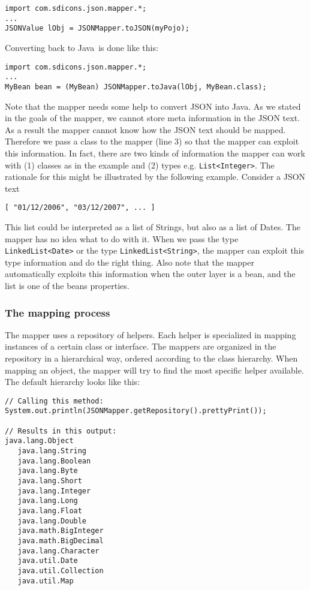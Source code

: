 \documentclass[a4paper]{article}
\newcommand{\java}{Java}
\begin{document}
\medskip
\begin{lstlisting}
import com.sdicons.json.mapper.*;
...
JSONValue lObj = JSONMapper.toJSON(myPojo);
\end{lstlisting}
\medskip

Converting back to \java\ is done like this:

\medskip
\begin{lstlisting}
import com.sdicons.json.mapper.*;
...
MyBean bean = (MyBean) JSONMapper.toJava(lObj, MyBean.class);
\end{lstlisting}
\medskip

Note that the mapper needs some help to convert JSON into \java. As we stated in the goals of the mapper, we cannot store meta information in the JSON text. As a result the mapper cannot know how the JSON text should be mapped. Therefore we pass a class to the mapper (line 3) so that the mapper can exploit this information. In fact, there are two kinds of information the mapper can work with (1) classes as in the example and (2) types e.g. \lstinline{List<Integer>}. The rationale for this might be illustrated by the following example. Consider a JSON text 

\medskip
\begin{lstlisting}
[ "01/12/2006", "03/12/2007", ... ]
\end{lstlisting}
\medskip

This list could be interpreted as a list of Strings, but also as a list of Dates. The mapper has no idea what to do with it. When we pass the type \lstinline{LinkedList<Date>} or the type \lstinline{LinkedList<String>}, the mapper can exploit this type information and do the right thing. Also note that the mapper automatically exploits this information when the outer layer is a bean, and the list is one of the beans properties.

\subsubsection{The mapping process}
\label{mappingprocess}

The mapper uses a repository of helpers. Each helper is specialized in mapping instances of a certain class or interface. The mappers are organized in the repository in a hierarchical way, ordered according to the class hierarchy. When mapping an object, the mapper will try to find the most specific helper available. The default hierarchy looks like this:

\begin{lstlisting}
// Calling this method:
System.out.println(JSONMapper.getRepository().prettyPrint());

// Results in this output:
java.lang.Object
   java.lang.String
   java.lang.Boolean
   java.lang.Byte
   java.lang.Short
   java.lang.Integer
   java.lang.Long
   java.lang.Float
   java.lang.Double
   java.math.BigInteger
   java.math.BigDecimal
   java.lang.Character
   java.util.Date
   java.util.Collection
   java.util.Map
\end{lstlisting}
\end{document}
